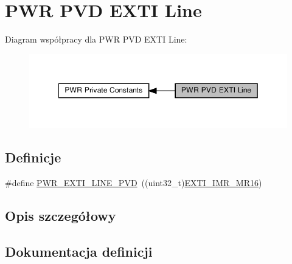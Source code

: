 \hypertarget{group___p_w_r___p_v_d___e_x_t_i___line}{}\section{P\+WR P\+VD E\+X\+TI Line}
\label{group___p_w_r___p_v_d___e_x_t_i___line}
Diagram współpracy dla P\+WR P\+VD E\+X\+TI Line\+:\nopagebreak
\begin{figure}[H]
\begin{center}
\leavevmode
\includegraphics[width=349pt]{group___p_w_r___p_v_d___e_x_t_i___line}
\end{center}
\end{figure}
\subsection*{Definicje}
\begin{DoxyCompactItemize}
\item 
\#define \hyperlink{group___p_w_r___p_v_d___e_x_t_i___line_ga43a49255649e03d2d2b6b12c5c379d2b}{P\+W\+R\+\_\+\+E\+X\+T\+I\+\_\+\+L\+I\+N\+E\+\_\+\+P\+VD}~((uint32\+\_\+t)\hyperlink{group___peripheral___registers___bits___definition_ga7419f78ed9044bdd237b452ef49e1b7f}{E\+X\+T\+I\+\_\+\+I\+M\+R\+\_\+\+M\+R16})
\end{DoxyCompactItemize}


\subsection{Opis szczegółowy}


\subsection{Dokumentacja definicji}
\mbox{\label{group___p_w_r___p_v_d___e_x_t_i___line_ga43a49255649e03d2d2b6b12c5c379d2b}} 
